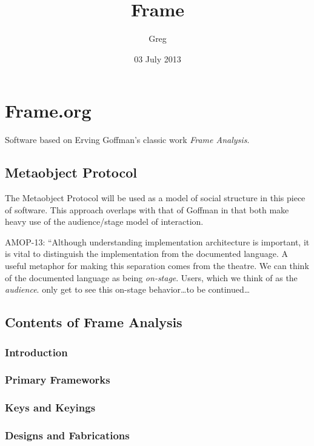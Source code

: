 \documentclass[11pt]{article}
\title{Frame}
\author{Greg}
\date{03 July 2013}
\begin{document}
\maketitle

\setcounter{tocdepth}{3}
\tableofcontents
\vspace*{1cm}
\section{Frame.org}
\label{sec-1}

Software based on Erving Goffman's classic work \emph{Frame Analysis}.
\subsection{Metaobject Protocol}
\label{sec-1.1}

The Metaobject Protocol will be used as a model of social structure
in this piece of software. This approach overlaps with that of Goffman
in that both make heavy use of the audience/stage model of interaction.

AMOP-13: ``Although understanding implementation architecture is
important, it is vital to distinguish the implementation from the
documented language. A useful metaphor for making this separation
comes from the theatre. We can think of the documented language
as being \emph{on-stage}. Users, which we think of as the \emph{audience}.
only get to see this on-stage behavior\ldots{}to be continued\ldots{}


\subsection{Contents of Frame Analysis}
\label{sec-1.2}

\subsubsection{Introduction}
\label{sec-1.2.1}

\subsubsection{Primary Frameworks}
\label{sec-1.2.2}

\subsubsection{Keys and Keyings}
\label{sec-1.2.3}

\subsubsection{Designs and Fabrications}
\label{sec-1.2.4}
\end{document}
